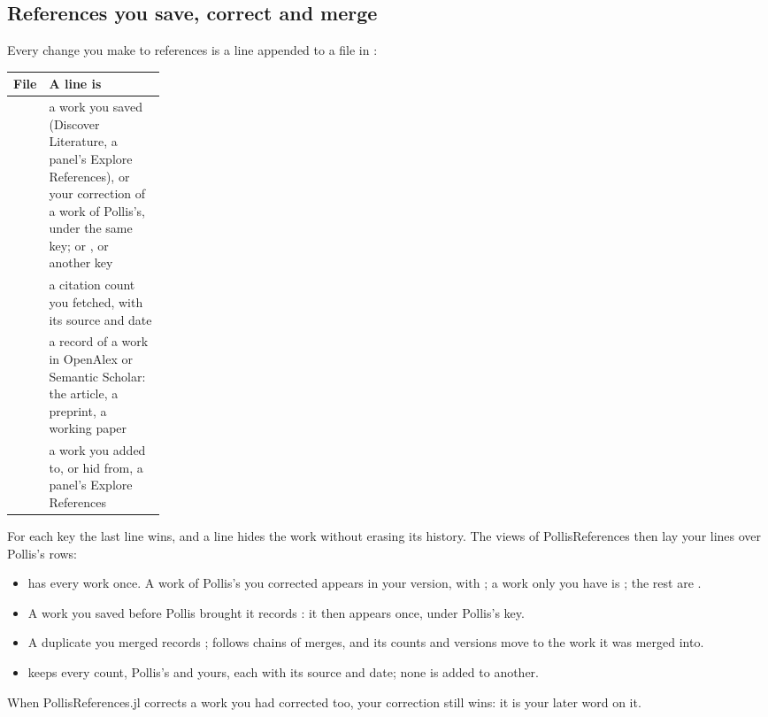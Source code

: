 \subsection{References you save, correct and merge}\label{sec:your-references}
Every change you make to references is a line appended to a file in :
\begin{center}\small
\renewcommand{\arraystretch}{1.2}
\begin{tabularx}{\linewidth}{@{}p{0.2\linewidth}L@{}}
\toprule
\textbf{File} & \textbf{A line is}\\
\midrule
{} & a work you saved (Discover Literature, a panel's Explore References), or your correction of a
  work of Pollis's, under the same key; or , or  another key\\
 & a citation count you fetched, with its source and date\\
 & a record of a work in OpenAlex or Semantic Scholar: the article, a preprint, a working paper\\
 & a work you added to, or hid from, a panel's Explore References\\
\bottomrule
\end{tabularx}
\end{center}
For each key the last line wins, and a line  hides the work without erasing its history. The views of
PollisReferences then lay your lines over Pollis's rows:
\begin{itemize}
  \item {} has every work once. A work of Pollis's you corrected appears in your version, with
     ; a work only you have is ; the rest are .
  \item A work you saved before Pollis brought it records : it then appears once, under Pollis's key.
  \item A duplicate you merged records ;  follows chains of merges, and its counts and
    versions move to the work it was merged into.
  \item {} keeps every count, Pollis's and yours, each with its source and date; none is added to another.
\end{itemize}
When PollisReferences.jl corrects a work you had corrected too, your correction still wins: it is your later word on
it.

